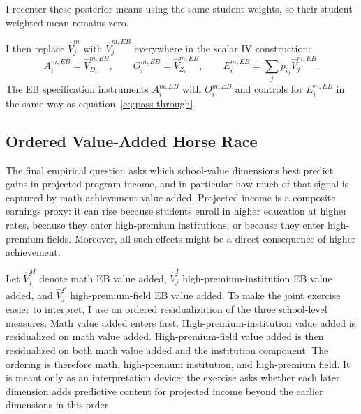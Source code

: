 \documentclass[a4paper, article, english, oneside, unknownkeysallowed, 12pt]{memoir}
\begin{document}
I recenter these posterior means using the same student weights, so their student-weighted mean remains zero.

I then replace $\widehat{V}_j^m$ with $\widehat{V}_{j}^{m,EB}$ everywhere in the scalar IV construction:
\begin{equation}
  A_i^{m,EB} = \widehat{V}_{D_i}^{m,EB},
  \qquad
  O_i^{m,EB} = \widehat{V}_{Z_i}^{m,EB},
  \qquad
  E_i^{m,EB} = \sum_j p_{ij}\widehat{V}_{j}^{m,EB}.
  \label{eq:eb-iv-objects}
\end{equation}
The EB specification instruments $A_i^{m,EB}$ with $O_i^{m,EB}$ and controls for $E_i^{m,EB}$ in the same way as equation~\eqref{eq:pass-through}.


\subsection{Ordered Value-Added Horse Race}

The final empirical question asks which school-value dimensions best predict gains in projected program income, and in particular how much of that signal is captured by math achievement value added.
Projected income is a composite earnings proxy: it can rise because students enroll in higher education at higher rates, because they enter high-premium institutions, or because they enter high-premium fields.
Moreover, all such effects might be a direct consequence of higher achievement.

Let $\widehat{V}_j^{M}$ denote math EB value added, $\widehat{V}_j^{I}$ high-premium-institution EB value added, and $\widehat{V}_j^{F}$ high-premium-field EB value added.
To make the joint exercise easier to interpret, I use an ordered residualization of the three school-level measures.
Math value added enters first.
High-premium-institution value added is residualized on math value added.
High-premium-field value added is then residualized on both math value added and the institution component.
The ordering is therefore math, high-premium institution, and high-premium field.
It is meant only as an interpretation device: the exercise asks whether each later dimension adds predictive content for projected income beyond the earlier dimensions in this order.
\end{document}
